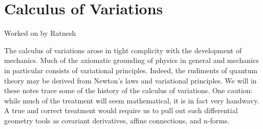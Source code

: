 \chapter{Calculus of Variations}
Worked on by Ratnesh

The calculus of variations arose in tight complicity with the development of mechanics. 
Much of the axiomatic grounding of physics in general and mechanics in particular consists of variational principles. 
Indeed, the rudiments of quantum theory may be derived from Newton's laws and variational principles. 
We will in these notes trace some of the history of the calculus of variations. 
One caution: while much of the treatment will seem mathematical, it is in fact very handwavy. 
A true and correct treatment would require us to pull out such differential geometry tools as covariant derivatives, affine connections, and n-forms. 